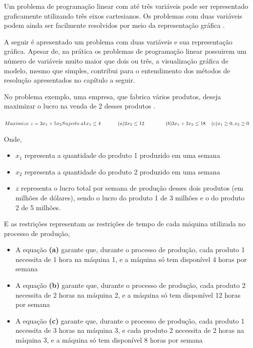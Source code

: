 Um problema de programação linear com até três variáveis pode ser representado graficamente utilizando três eixos cartesianos. Os problemas com duas variáveis podem ainda ser facilmente resolvidos por meio da representação gráfica \cite{Passos}. 

A seguir é apresentado um problema com duas variáveis e sua representação gráfica. Apesar de, na prática os problemas de programação linear possuirem um número de variáveis muito maior que dois ou três, a visualização gráfica de modelo, mesmo que simples, contribui para o entendimento dos métodos de resolução apresentados no capítulo a seguir.

No problema exemplo, uma empresa, que fabrica vários produtos, deseja maximizar o lucro na venda de 2 desses produtos \cite{Hillier}.

$\\
Maximize\ z=3x_{1}+5x_{2}\\
Sujeito\ a \\
        1x_{1}\leq 4 \; \; \; \; \; \; \; \; \; \; \; \;(a)\\
        2x_{2}\leq 12 \; \; \; \; \; \; \; \; \; \; \; \; \; \; \;(b)\\
        3x_{1}+2x_{2}\leq 18 \; \; \; \; (c)\\
        x_{1}\geq 0, x_{2}\geq 0 $

Onde, 
\begin{itemize}
\item \textbf {$x_{1}$} representa a quantidade do produto 1 produzido em uma semana
\item \textbf {$x_{2}$} representa a quantidade do produto 2 produzido em uma semana
\item \textbf {$z$} representa o lucro total por semana de produção desses dois produtos (em milhões de dólares), sendo o lucro do produto 1 de 3 milhões e o do produto 2 de 5 milhões.
\end{itemize}

E as restrições representam as restrições de tempo de cada máquina utilizada no processo de produção,
\begin{itemize}
\item A equação \textbf {(a)} garante que, durante o processo de produção, cada produto 1 necessita de 1 hora na máquina 1, e a máquina só tem disponível 4 horas por semana
\item A equação \textbf {(b)} garante que, durante o processo de produção, cada produto 2 necessita de 2 horas na máquina 2, e a máquina só tem disponível 12 horas por semana
\item A equação \textbf {(c)} garante que, durante o processo de produção, cada produto 1 necessita de 3 horas na máquina 3, e cada produto 2 necessita de 2 horas na máquina 3, e a máquina só tem disponível 8 horas por semana
\end{itemize}

